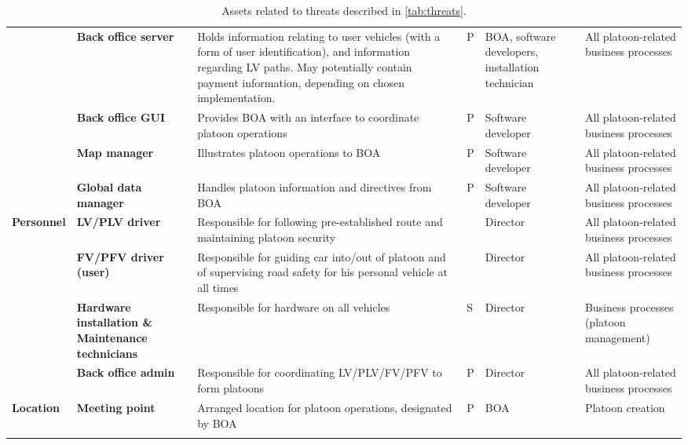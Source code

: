 \documentclass[british,11pt,a4paper]{article}
\begin{document}
\begin{longtable}{|p{2cm}|p{2cm}|p{5cm}|p{1cm}|p{2cm}|p{2.5cm}|}
 & \textbf{Back office server} & Holds information relating to user vehicles (with a form of user identification), and information regarding LV paths. May potentially contain payment information, depending on chosen implementation. & P & BOA, software developers, installation technician & All platoon-related business processes \\ \cline{2-6} 
 & \textbf{Back office GUI} & Provides BOA with an interface to coordinate platoon operations & P & Software developer & All platoon-related business processes \\ \cline{2-6} 
 & \textbf{Map manager} & Illustrates platoon operations to BOA & P & Software developer & All platoon-related business processes \\ \cline{2-6} 
 & \textbf{Global data manager} & Handles platoon information and directives from BOA & P & Software developer & All platoon-related business processes \\ \hline
\multirow{4}{2cm}{\textbf{Personnel}} & \textbf{LV/PLV driver} & Responsible for following pre-established route and maintaining platoon security &  & Director & All platoon-related business processes \\ \cline{2-6} 
 & \textbf{FV/PFV driver (user)} & Responsible for guiding car into/out of platoon and of supervising road safety for his personal vehicle at all times &  & Director & All platoon-related business processes \\ \cline{2-6} 
 & \textbf{Hardware installation \& Maintenance technicians} & Responsible for hardware on all vehicles & S & Director & Business processes (platoon management) \\ \cline{2-6} 
 & \textbf{Back office admin} & Responsible for coordinating LV/PLV/FV/PFV to form platoons & P & Director & All platoon-related business processes \\ \hline
\textbf{Location} & \textbf{Meeting point} & Arranged location for platoon operations, designated by BOA & P & BOA & Platoon creation \\ \hline
\caption{Assets related to threats described in \autoref{tab:threats}.}
\label{tab:assets}
\end{longtable}
\end{document}
